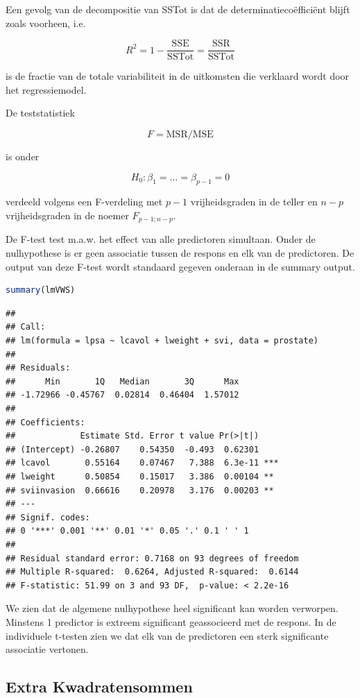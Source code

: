 \documentclass[
  12pt,dutch,coursenotes]{book}
\begin{document}
Een gevolg van de decompositie van SSTot is dat de determinatiecoëfficiënt blijft zoals voorheen, i.e.

\[
  R^2 = 1-\frac{\text{SSE}}{\text{SSTot}} = \frac{\text{SSR}}{\text{SSTot}}
\]

is de fractie van de totale variabiliteit in de uitkomsten die verklaard wordt door het regressiemodel.

De teststatistiek

\[
F=\text{MSR}/\text{MSE}
\]

is onder

\[H_0:\beta_1=\ldots=\beta_{p-1}=0\]

verdeeld volgens een F-verdeling met \(p-1\) vrijheidsgraden in de teller en \(n-p\) vrijheidsgraden in de noemer \(F_{p-1;n-p}\).

De F-test test m.a.w. het effect van alle predictoren simultaan. Onder de nulhypothese is er geen associatie tussen de respons en elk van de predictoren. De output van deze F-test wordt standaard gegeven onderaan in de summary output.

\begin{lstlisting}[language=R]
summary(lmVWS)
\end{lstlisting}

\begin{lstlisting}
## 
## Call:
## lm(formula = lpsa ~ lcavol + lweight + svi, data = prostate)
## 
## Residuals:
##      Min       1Q   Median       3Q      Max 
## -1.72966 -0.45767  0.02814  0.46404  1.57012 
## 
## Coefficients:
##             Estimate Std. Error t value Pr(>|t|)    
## (Intercept) -0.26807    0.54350  -0.493  0.62301    
## lcavol       0.55164    0.07467   7.388  6.3e-11 ***
## lweight      0.50854    0.15017   3.386  0.00104 ** 
## sviinvasion  0.66616    0.20978   3.176  0.00203 ** 
## ---
## Signif. codes:  
## 0 '***' 0.001 '**' 0.01 '*' 0.05 '.' 0.1 ' ' 1
## 
## Residual standard error: 0.7168 on 93 degrees of freedom
## Multiple R-squared:  0.6264, Adjusted R-squared:  0.6144 
## F-statistic: 51.99 on 3 and 93 DF,  p-value: < 2.2e-16
\end{lstlisting}

We zien dat de algemene nulhypothese heel significant kan worden verworpen. Minstens 1 predictor is extreem significant geassocieerd met de respons. In de individuele t-testen zien we dat elk van de predictoren een sterk significante associatie vertonen.

\hypertarget{extra-kwadratensommen}{%
\subsection{Extra Kwadratensommen}\label{extra-kwadratensommen}}
\end{document}
